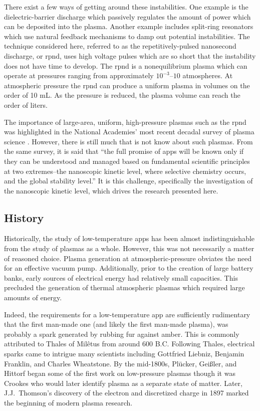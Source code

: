 There exist a few ways of getting around these instabilities. One example is the
dielectric-barrier discharge which passively regulates the amount of power which
can be deposited into the plasma. Another example includes split-ring resonators
which use natural feedback mechanisms to damp out potential instabilities. The
technique considered here, referred to as the repetitively-pulsed nanosecond
discharge, or \acs{rpnd}, uses high voltage pulses which are so short that the
instability does not have time to develop. The \acs{rpnd} is a nonequilibrium
plasma which can operate at pressures ranging from approximately $10^{-3}$--$10$
atmospheres. At atmospheric pressure the \acs{rpnd} can produce a uniform plasma
in volumes on the order of 10 mL. As the pressure is reduced, the plasma volume
can reach the order of liters.

The importance of large-area, uniform, high-pressure plasmas such as the
\acs{rpnd} was highlighted in the National Academies' most recent decadal survey
of plasma science \cite{NA2007}. However, there is still much that is not know
about such plasmas. From the same survey, it is said that ``the full promise of
\acs{app}s will be known only if they can be understood and managed based on
fundamental scientific principles at two extremes--the nanoscopic kinetic level,
where selective chemistry occurs, and the global stability level.'' It is this
challenge, specifically the investigation of the nanoscopic kinetic level, which
drives the research presented here.

\subsection{History}

Historically, the study of low-temperature \acs{app}s has been almost
indistinguishable from the study of plasmas as a whole. However, this was not
necessarily a matter of reasoned choice. Plasma generation at
atmospheric-pressure obviates the need for an effective vacuum pump.
Additionally, prior to the creation of large battery banks, early sources of
electrical energy had relatively small capacities. This precluded the generation
of thermal atmospheric plasmas which required large amounts of energy.

Indeed, the requirements for a low-temperature \acs{app} are sufficiently
rudimentary that the first man-made one (and likely the first man-made plasma),
was probably a spark generated by rubbing fur against amber. This is commonly
attributed to Thales of Mil\^{e}tus from around 600 B.C. Following Thales,
electrical sparks came to intrigue many scientists including Gottfried Liebniz,
Benjamin Franklin, and Charles Wheatstone. By the mid-1800s, Pl\"{u}cker,
Gei\ss{}ler, and Hittorf began some of the first work on low-pressure plasmas
though it was Crookes who would later identify plasma as a separate state of
matter. Later, J.J.\ Thomson's discovery of the electron and discretized charge
in 1897 marked the beginning of modern plasma research.

